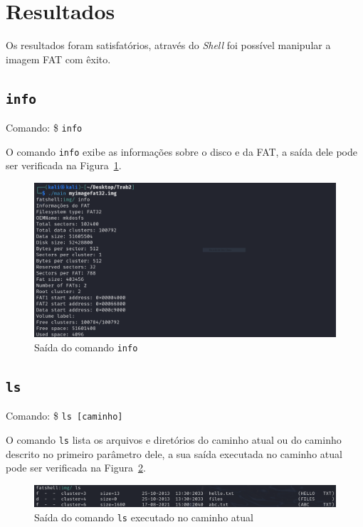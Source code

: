 \documentclass[
    12pt,				%
    oneside,   	        %
    a4paper,			%
    english,			%
    french,				%
    spanish,			%
    brazil,				%
    ]{pacotes/abntex2}
\begin{document}

\graphicspath{ {./figuras/resultados} }

\section{Resultados}
\label{sec:resultados}
Os resultados foram satisfatórios, através do \textit{Shell} foi possível manipular a imagem FAT com êxito.


\subsection{\texttt{info}}
\label{subsec:info}
Comando: \$ \texttt{info}
 
O comando \texttt{info} exibe as informações sobre o disco e da FAT, a saída dele pode ser verificada na Figura~\ref{fig:info}.

\begin{figure}[H]
    \centering
    \includegraphics[width=450pt]{0-info.PNG}
    \caption{Saída do comando \texttt{info}}
    \label{fig:info}
\end{figure}


\subsection{\texttt{ls}}
\label{subsec:ls}
Comando: \$ \texttt{ls [caminho]} 

O comando \texttt{ls} lista os arquivos e diretórios do caminho atual ou do caminho descrito no primeiro parâmetro dele, a sua saída executada no caminho atual pode ser verificada na Figura~\ref{fig:ls}.

\begin{figure}[H]
    \centering
    \includegraphics[width=450pt]{figuras/resultados/1-ls.PNG}
    \caption{Saída do comando \texttt{ls} executado no caminho atual}
    \label{fig:ls}
\end{figure}
\end{document}
